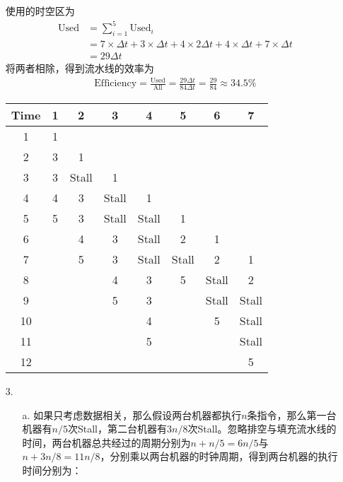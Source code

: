 \documentclass[UTF8,zihao=-4]{ctexart}
\begin{document}
\begin{enumerate}
		使用的时空区为
		\begin{align*}
			\text{Used}&=\sum_{i=1}^{5}\text{Used}_i \\
			&= 7\times \Delta t+3\times \Delta t+4\times 2\Delta t+4\times \Delta t+7\times \Delta t \\
			&= 29\Delta t
		\end{align*}
		将两者相除，得到流水线的效率为
		\begin{align*}
			\text{Efficiency}=\frac{\text{Used}}{\text{All}}=\frac{29\Delta t}{84\Delta t}=\frac{29}{84}\approx 34.5\%
		\end{align*}
		\begin{center}
			\begin{tabular}{|c|c|c|c|c|c|c|c|}
				\hline
				Time & 1 &   2   &   3   &   4   &   5   &   6   &   7   \\ \hline
				 1   & 1 &       &       &       &       &       &       \\
				 2   & 3 &   1   &       &       &       &       &       \\
				 3   & 3 & Stall &   1   &       &       &       &       \\
				 4   & 4 &   3   & Stall &   1   &       &       &       \\
				 5   & 5 &   3   & Stall & Stall &   1   &       &       \\
				 6   &   &   4   &   3   & Stall &   2   &   1   &       \\
				 7   &   &   5   &   3   & Stall & Stall &   2   &   1   \\
				 8   &   &       &   4   &   3   &   5   & Stall &   2   \\
				 9   &   &       &   5   &   3   &       & Stall & Stall \\
				 10  &   &       &       &   4   &       &   5   & Stall \\
				 11  &   &       &       &   5   &       &       & Stall \\
				 12  &   &       &       &       &       &       &   5   \\ \hline
			\end{tabular}
		\end{center}
		\item[3.]
		\begin{enumerate}
			\item[a.]如果只考虑数据相关，那么假设两台机器都执行$n$条指令，那么第一台机器有$n/5$次Stall，第二台机器有$3n/8$次Stall。忽略排空与填充流水线的时间，两台机器总共经过的周期分别为$n+n/5=6n/5$与$n+3n/8=11n/8$，分别乘以两台机器的时钟周期，得到两台机器的执行时间分别为：

\end{enumerate}
\end{enumerate}
\end{document}
